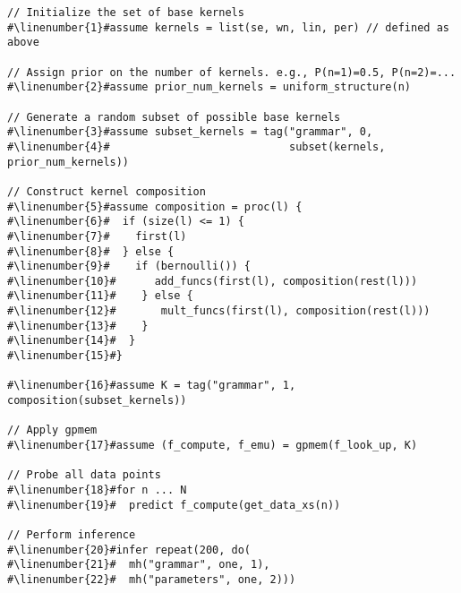 \begin{mdframed}
\begin{minipage}{\linewidth}
\small
\belowcaptionskip=-10pt
\begin{lstlisting}[mathescape,label=alg:structureVent,basicstyle=\selectfont\ttfamily,numbers=none,caption={Structure
Learning},escapechar=\#]
// Initialize the set of base kernels 
#\linenumber{1}#assume kernels = list(se, wn, lin, per) // defined as above

// Assign prior on the number of kernels. e.g., P(n=1)=0.5, P(n=2)=...
#\linenumber{2}#assume prior_num_kernels = uniform_structure(n)

// Generate a random subset of possible base kernels
#\linenumber{3}#assume subset_kernels = tag("grammar", 0,
#\linenumber{4}#                            subset(kernels, prior_num_kernels))

// Construct kernel composition
#\linenumber{5}#assume composition = proc(l) {
#\linenumber{6}#  if (size(l) <= 1) {
#\linenumber{7}#    first(l)
#\linenumber{8}#  } else {
#\linenumber{9}#    if (bernoulli()) {
#\linenumber{10}#      add_funcs(first(l), composition(rest(l)))
#\linenumber{11}#    } else {
#\linenumber{12}#       mult_funcs(first(l), composition(rest(l)))
#\linenumber{13}#    }
#\linenumber{14}#  }
#\linenumber{15}#}

#\linenumber{16}#assume K = tag("grammar", 1, composition(subset_kernels))

// Apply gpmem 
#\linenumber{17}#assume (f_compute, f_emu) = gpmem(f_look_up, K)

// Probe all data points
#\linenumber{18}#for n ... N
#\linenumber{19}#  predict f_compute(get_data_xs(n))

// Perform inference
#\linenumber{20}#infer repeat(200, do(
#\linenumber{21}#  mh("grammar", one, 1),
#\linenumber{22}#  mh("parameters", one, 2)))
\end{lstlisting}

\end{minipage}
\end{mdframed}
